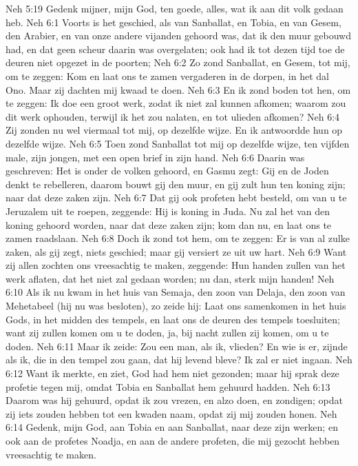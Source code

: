 Neh 5:19  Gedenk mijner, mijn God, ten goede, alles, wat ik aan dit volk gedaan heb.
Neh 6:1  Voorts is het geschied, als van Sanballat, en Tobia, en van Gesem, den Arabier, en van onze andere vijanden gehoord was, dat ik den muur gebouwd had, en dat geen scheur daarin was overgelaten; ook had ik tot dezen tijd toe de deuren niet opgezet in de poorten;
Neh 6:2  Zo zond Sanballat, en Gesem, tot mij, om te zeggen: Kom en laat ons te zamen vergaderen in de dorpen, in het dal Ono. Maar zij dachten mij kwaad te doen.
Neh 6:3  En ik zond boden tot hen, om te zeggen: Ik doe een groot werk, zodat ik niet zal kunnen afkomen; waarom zou dit werk ophouden, terwijl ik het zou nalaten, en tot ulieden afkomen?
Neh 6:4  Zij zonden nu wel viermaal tot mij, op dezelfde wijze. En ik antwoordde hun op dezelfde wijze.
Neh 6:5  Toen zond Sanballat tot mij op dezelfde wijze, ten vijfden male, zijn jongen, met een open brief in zijn hand.
Neh 6:6  Daarin was geschreven: Het is onder de volken gehoord, en Gasmu zegt: Gij en de Joden denkt te rebelleren, daarom bouwt gij den muur, en gij zult hun ten koning zijn; naar dat deze zaken zijn.
Neh 6:7  Dat gij ook profeten hebt besteld, om van u te Jeruzalem uit te roepen, zeggende: Hij is koning in Juda. Nu zal het van den koning gehoord worden, naar dat deze zaken zijn; kom dan nu, en laat ons te zamen raadslaan.
Neh 6:8  Doch ik zond tot hem, om te zeggen: Er is van al zulke zaken, als gij zegt, niets geschied; maar gij versiert ze uit uw hart.
Neh 6:9  Want zij allen zochten ons vreesachtig te maken, zeggende: Hun handen zullen van het werk aflaten, dat het niet zal gedaan worden; nu dan, sterk mijn handen!
Neh 6:10  Als ik nu kwam in het huis van Semaja, den zoon van Delaja, den zoon van Mehetabeel (hij nu was besloten), zo zeide hij: Laat ons samenkomen in het huis Gods, in het midden des tempels, en laat ons de deuren des tempels toesluiten; want zij zullen komen om u te doden, ja, bij nacht zullen zij komen, om u te doden.
Neh 6:11  Maar ik zeide: Zou een man, als ik, vlieden? En wie is er, zijnde als ik, die in den tempel zou gaan, dat hij levend bleve? Ik zal er niet ingaan.
Neh 6:12  Want ik merkte, en ziet, God had hem niet gezonden; maar hij sprak deze profetie tegen mij, omdat Tobia en Sanballat hem gehuurd hadden.
Neh 6:13  Daarom was hij gehuurd, opdat ik zou vrezen, en alzo doen, en zondigen; opdat zij iets zouden hebben tot een kwaden naam, opdat zij mij zouden honen.
Neh 6:14  Gedenk, mijn God, aan Tobia en aan Sanballat, naar deze zijn werken; en ook aan de profetes Noadja, en aan de andere profeten, die mij gezocht hebben vreesachtig te maken.
